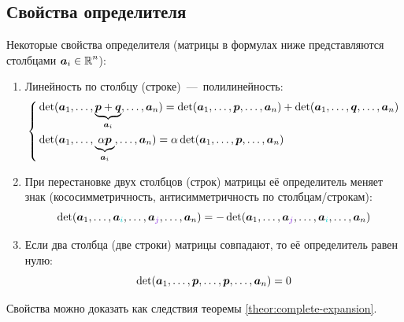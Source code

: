 \documentclass[a4paper,12pt]{article}
\begin{document}
  
  \subsection{Свойства определителя}
  
  \begin{theorem}
    Некоторые свойства определителя (матрицы в формулах ниже представляются столбцами $\bds a_i \hm\in \RR^n$):
    \begin{enumerate}
      \item Линейность по столбцу (строке)~---~полилинейность:
        \begin{equation}\label{eq:poly-linearity}
          \left\{
            \begin{aligned}
              &\det (\boldsymbol a_1, \ldots, \underbrace{\boldsymbol p + \boldsymbol q}_{\boldsymbol a_i}, \ldots, \boldsymbol a_n)
                = \det (\boldsymbol a_1, \ldots, \boldsymbol p, \ldots, \boldsymbol a_n)
                + \det (\boldsymbol a_1, \ldots, \boldsymbol q, \ldots, \boldsymbol a_n)\\
              &\det (\boldsymbol a_1, \ldots, \underbrace{\alpha \boldsymbol p}_{\boldsymbol a_i}, \ldots, \boldsymbol a_n)
                = \alpha \det (\boldsymbol a_1, \ldots, \boldsymbol p, \ldots, \boldsymbol a_n)
            \end{aligned}
          \right.
        \end{equation}
      \item При перестановке двух столбцов (строк) матрицы её определитель меняет знак (кососимметричность, антисимметричность по столбцам/строкам):
        \begin{equation}\label{eq:row-swap}
          \det (\bds a_1, \ldots, \bds a_{\textcolor{light-cyan}{i}}, \ldots, \bds a_{\textcolor{light-purple}{j}}, \ldots, \bds a_n)
          = -\det (\bds a_1, \ldots, \bds a_{\textcolor{light-purple}{j}}, \ldots, \bds a_{\textcolor{light-cyan}{i}}, \ldots, \bds a_n)
        \end{equation}
      \item Если два столбца (две строки) матрицы совпадают, то её определитель равен нулю:
        \begin{equation}\label{eq:same-rows}
          \det (\boldsymbol a_1, \ldots, \boldsymbol p, \ldots, \boldsymbol p, \ldots, \boldsymbol a_n) = 0
        \end{equation}
    \end{enumerate}
  \end{theorem}
  
  Свойства можно доказать как следствия теоремы \ref{theor:complete-expansion}.
  
\end{document}
